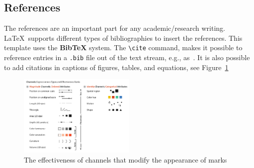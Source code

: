 \documentclass[11pt,a4paper]{article} %
\begin{document}
\subsection{References}
The references are an important part for any academic/research writing. \LaTeX\ supports different types of bibliographies to insert the references. This template uses the \textbf{BibTeX} system.
The \verb|\cite| command, makes it possible to reference entries in a \verb|.bib| file out of the text stream, e.g., as~\cite{2019_bioinformatics_ordino}.
It is also possible to add citations in captions of figures, tables, and equations, see Figure~\ref{fig:munzner_channels}
\begin{figure}[!htb]
    \centering
    \includegraphics[width=0.5\textwidth]{img/Munzner_Channels.png}
    \caption{The effectiveness of channels that modify the appearance of marks~\cite{munzner_visualization_2014}}
    \label{fig:munzner_channels}
\end{figure}

\begin{acronym}
\end{acronym}


\end{document}
